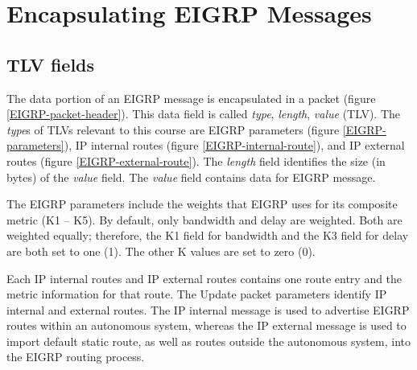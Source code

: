 \section{Encapsulating EIGRP Messages}
\subsection{TLV fields}
The data portion of an EIGRP message is encapsulated in a packet (figure \ref{EIGRP-packet-header}). This data field is called \emph{type}, \emph{length}, \emph{value} (TLV). The \emph{type}s of TLVs relevant to this course are EIGRP parameters (figure \ref{EIGRP-parameters}), IP internal routes (figure \ref{EIGRP-internal-route}), and IP external routes (figure \ref{EIGRP-external-route}). The \emph{length} field identifies the size (in bytes) of the \emph{value} field. The \emph{value} field contains data for EIGRP message.\par 
The EIGRP parameters include the weights that EIGRP uses for its composite metric (K1 -- K5). By default, only bandwidth and delay are weighted. Both are weighted equally; therefore, the K1 field for bandwidth and the K3 field for delay are both set to one (1). The other K values are set to zero (0).\par 
Each IP internal routes and IP external routes contains one route entry and the metric information for that route. The Update packet parameters identify IP internal and external routes. The IP internal message is used to advertise EIGRP routes within an autonomous system, whereas the IP external message is used to import default static route, as well as routes outside the autonomous system, into the EIGRP routing process.

